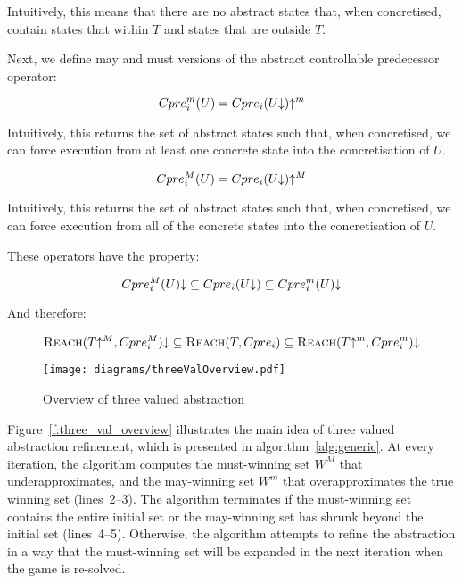 Intuitively, this means that there are no abstract states that, when concretised, contain states that within $T$ and states that are outside $T$.

Next, we define may and must versions of the abstract controllable predecessor operator:

\begin{equation}
    Cpre_i^m(U) = Cpre_i(U\mathord{\downarrow})\mathord{\uparrow^m}
    \label{eqn:def_cpre_m}
\end{equation}

Intuitively, this returns the set of abstract states such that, when concretised, we can force execution from at least one concrete state into the concretisation of $U$.

\begin{equation}
    Cpre_i^M(U) = Cpre_i(U\mathord{\downarrow})\mathord{\uparrow^M}
    \label{eqn:def_cpre_M}
\end{equation}

Intuitively, this returns the set of abstract states such that, when concretised, we can force execution from all of the concrete states into the concretisation of $U$.

These operators have the property:

\begin{equation}
Cpre_i^M(U)\mathord{\downarrow} \subseteq Cpre_i(U\mathord{\downarrow}) \subseteq Cpre_i^m(U)\mathord{\downarrow}
\end{equation}

And therefore:

\begin{equation}
\textsc{Reach}(T\mathord{\uparrow^M}, Cpre_i^M)\mathord{\downarrow} \subseteq \textsc{Reach}(T, Cpre_i) \subseteq \textsc{Reach}(T\mathord{\uparrow^m}, Cpre_i^m)\mathord{\downarrow}
\end{equation}

\begin{figure}[t]
\centering
\texttt{[image: diagrams/threeValOverview.pdf]}
\caption{Overview of three valued abstraction}
\label{fig:three_val_overview}
\end{figure}

Figure~\ref{f:three_val_overview} illustrates the main idea of three valued abstraction refinement, which is presented in algorithm~\ref{alg:generic}.  At every iteration, the algorithm computes the must-winning set $W^M$ that underapproximates, and the may-winning set $W^m$ that overapproximates the true winning set (lines~2--3).  The algorithm terminates if the must-winning set contains the entire initial set or the may-winning set has shrunk beyond the initial set (lines~4--5).  Otherwise, the algorithm attempts to refine the abstraction in a way that the must-winning set will be expanded in the next iteration when the game is re-solved.

